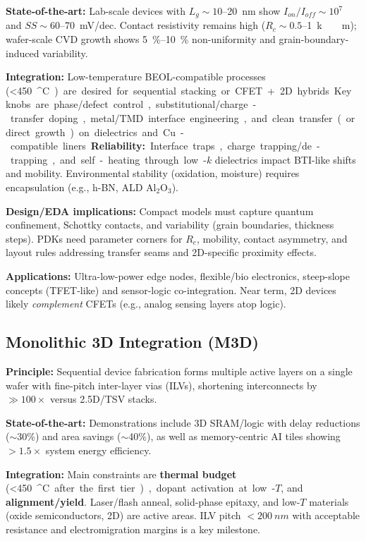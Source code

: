 \documentclass[conference]{IEEEtran}
\begin{document}
\textbf{State-of-the-art:}
Lab-scale devices with $L_g\!\sim\!10$–\SI{20}{nm} show $I_{on}/I_{off}\!\sim\!10^7$ and $SS\!\sim\!60$–\SI{70}{mV/dec}.
Contact resistivity remains high ($R_c\!\sim\!0.5$–\SI{1}{k\Omega\cdot\mu m}); wafer-scale CVD growth shows \SI{5}{\%}–\SI{10}{\%} non-uniformity and grain-boundary-induced variability.

\textbf{Integration:}
Low-temperature BEOL-compatible processes (\SI{<450}{^\circ C}) are desired for sequential stacking or CFET+2D hybrids.
Key knobs are phase/defect control, substitutional/charge-transfer doping, metal/TMD interface engineering, and clean transfer (or direct growth) on dielectrics and Cu-compatible liners.

\textbf{Reliability:}
Interface traps, charge trapping/de-trapping, and self-heating through low-$k$ dielectrics impact BTI-like shifts and mobility.
Environmental stability (oxidation, moisture) requires encapsulation (e.g., h-BN, ALD Al$_2$O$_3$).

\textbf{Design/EDA implications:}
Compact models must capture quantum confinement, Schottky contacts, and variability (grain boundaries, thickness steps).
PDKs need parameter corners for $R_c$, mobility, contact asymmetry, and layout rules addressing transfer seams and 2D-specific proximity effects.

\textbf{Applications:}
Ultra-low-power edge nodes, flexible/bio electronics, steep-slope concepts (TFET-like) and sensor-logic co-integration.
Near term, 2D devices likely \emph{complement} CFETs (e.g., analog sensing layers atop logic).

\subsection{Monolithic 3D Integration (M3D)}
\textbf{Principle:}
Sequential device fabrication forms multiple active layers on a single wafer with fine-pitch inter-layer vias (ILVs), shortening interconnects by \(\gg\!100\times\) versus 2.5D/TSV stacks.

\textbf{State-of-the-art:}
Demonstrations include 3D SRAM/logic with delay reductions ($\sim$30\%) and area savings ($\sim$40\%), as well as memory-centric AI tiles showing $>\!1.5\times$ system energy efficiency.

\textbf{Integration:}
Main constraints are \textbf{thermal budget} (\SI{<450}{^\circ C} after the first tier), dopant activation at low-$T$, and \textbf{alignment/yield}.
Laser/flash anneal, solid-phase epitaxy, and low-$T$ materials (oxide semiconductors, 2D) are active areas.
ILV pitch $<\SI{200}{nm}$ with acceptable resistance and electromigration margins is a key milestone.
\end{document}
